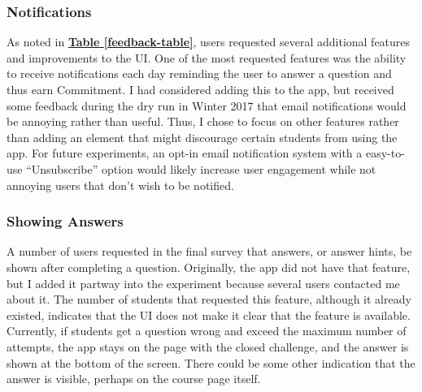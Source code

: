 \subsubsection{Notifications}

\par As noted in \textbf{\hyperref[feedback-table]{Table \ref*{feedback-table}}}, users requested several additional features and improvements to the UI. One of the most requested features was the ability to receive notifications each day reminding the user to answer a question and thus earn Commitment. I had considered adding this to the app, but received some feedback during the dry run in Winter 2017 that email notifications would be annoying rather than useful. Thus, I chose to focus on other features rather than adding an element that might discourage certain students from using the app. For future experiments, an opt-in email notification system with a easy-to-use ``Unsubscribe'' option would likely increase user engagement while not annoying users that don't wish to be notified.

\subsubsection{Showing Answers}

\par A number of users requested in the final survey that answers, or answer hints, be shown after completing a question. Originally, the app did not have that feature, but I added it partway into the experiment because several users contacted me about it. The number of students that requested this feature, although it already existed, indicates that the UI does not make it clear that the feature is available. Currently, if students get a question wrong and exceed the maximum number of attempts, the app stays on the page with the closed challenge, and the answer is shown at the bottom of the screen. There could be some other indication that the answer is visible, perhaps on the course page itself.